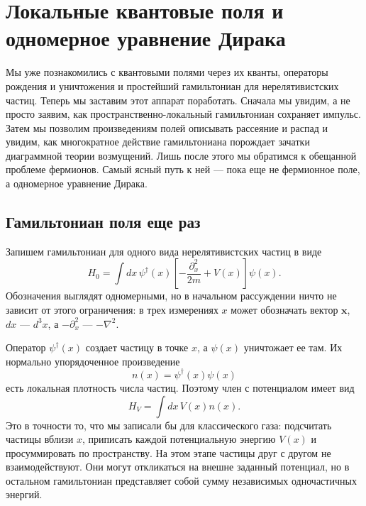 \chapter{Локальные квантовые поля и одномерное уравнение Дирака}

Мы уже познакомились с квантовыми полями через их кванты, операторы рождения и уничтожения и простейший гамильтониан для нерелятивистских частиц. Теперь мы заставим этот аппарат поработать. Сначала мы увидим, а не просто заявим, как пространственно-локальный гамильтониан сохраняет импульс. Затем мы позволим произведениям полей описывать рассеяние и распад и увидим, как многократное действие гамильтониана порождает зачатки диаграммной теории возмущений. Лишь после этого мы обратимся к обещанной проблеме фермионов. Самый ясный путь к ней — пока еще не фермионное поле, а одномерное уравнение Дирака.

\section{Гамильтониан поля еще раз}

Запишем гамильтониан для одного вида нерелятивистских частиц в виде
\begin{equation}
H_0=\int dx\,
\psi^\dagger(x)
\left[-\frac{\partial_x^2}{2m}+V(x)\right]
\psi(x).
\label{eq:l9-nonrel-hamiltonian}
\end{equation}
Обозначения выглядят одномерными, но в начальном рассуждении ничто не зависит от этого ограничения: в трех измерениях \(x\) может обозначать вектор \(\mathbf{x}\), \(dx\) — \(d^3x\), а \(-\partial_x^2\) — \(-\nabla^2\).

Оператор \(\psi^\dagger(x)\) создает частицу в точке \(x\), а \(\psi(x)\) уничтожает ее там. Их нормально упорядоченное произведение
\begin{equation}
n(x)=\psi^\dagger(x)\psi(x)
\end{equation}
есть локальная плотность числа частиц. Поэтому член с потенциалом имеет вид
\begin{equation}
H_V=\int dx\,V(x)n(x).
\end{equation}
Это в точности то, что мы записали бы для классического газа: подсчитать частицы вблизи \(x\), приписать каждой потенциальную энергию \(V(x)\) и просуммировать по пространству. На этом этапе частицы друг с другом не взаимодействуют. Они могут откликаться на внешне заданный потенциал, но в остальном гамильтониан представляет собой сумму независимых одночастичных энергий.

